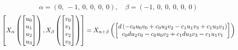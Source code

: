 \documentclass[11pt]{article}
\theoremstyle{definition}
\begin{document}
\[
\alpha = \left( 0, \  -1, \  0, \  0, \  0, \  0\right), \quad \beta = \left( -1, \  0, \  0, \  0, \  0, \  0\right)
\]
\[
\scaletoalign{\textwidth}{\left[ X_{\alpha}\left(\left[\begin{matrix}u_{0}\\u_{1}\\u_{2}\\u_{3}\end{matrix}\right]\right), X_{\beta}\left(\left[\begin{matrix}v_{0}\\v_{1}\\v_{2}\\v_{3}\end{matrix}\right]\right) \right] = X_{\alpha + \beta}\left(\left[\begin{matrix}d \left(- c_{0} u_{0} v_{0} + c_{0} u_{2} v_{2} - c_{1} u_{1} v_{3} + c_{1} u_{3} v_{1}\right)\\c_{0} d u_{2} v_{0} - c_{0} u_{0} v_{2} + c_{1} d u_{3} v_{3} - c_{1} u_{1} v_{1}\end{matrix}\right]\right)}
\]
\end{document}
